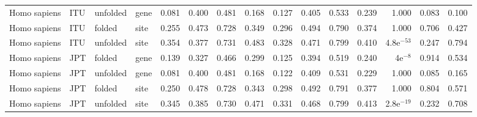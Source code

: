\begin{longtable}{llllrrrrrrrrrrr}
        Homo sapiens &                       ITU &  unfolded &  gene &                              0.081 &                               0.400 &                 0.481 &                 0.168 &                              0.127 &                               0.405 &                 0.533 &                 0.239 &         1.000 &  0.083 &  0.100 \\
        Homo sapiens &                       ITU &    folded &  site &                              0.255 &                               0.473 &                 0.728 &                 0.349 &                              0.296 &                               0.494 &                 0.790 &                 0.374 &         1.000 &  0.706 &  0.427 \\
        Homo sapiens &                       ITU &  unfolded &  site &                              0.354 &                               0.377 &                 0.731 &                 0.483 &                              0.328 &                               0.471 &                 0.799 &                 0.410 &  4.8e$^{-53}$ &  0.247 &  0.794 \\
        Homo sapiens &                       JPT &    folded &  gene &                              0.139 &                               0.327 &                 0.466 &                 0.299 &                              0.125 &                               0.394 &                 0.519 &                 0.240 &     4e$^{-8}$ &  0.914 &  0.534 \\
        Homo sapiens &                       JPT &  unfolded &  gene &                              0.081 &                               0.400 &                 0.481 &                 0.168 &                              0.122 &                               0.409 &                 0.531 &                 0.229 &         1.000 &  0.085 &  0.165 \\
        Homo sapiens &                       JPT &    folded &  site &                              0.250 &                               0.478 &                 0.728 &                 0.343 &                              0.298 &                               0.492 &                 0.791 &                 0.377 &         1.000 &  0.804 &  0.571 \\
        Homo sapiens &                       JPT &  unfolded &  site &                              0.345 &                               0.385 &                 0.730 &                 0.471 &                              0.331 &                               0.468 &                 0.799 &                 0.413 &  2.8e$^{-19}$ &  0.232 &  0.708 \\

\end{longtable}
